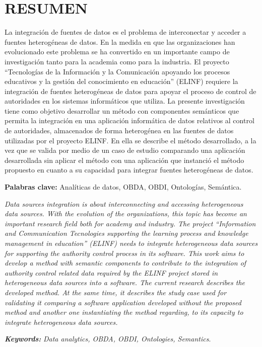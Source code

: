 \chapter*{\large RESUMEN}

La integración de fuentes de datos es el problema de interconectar y acceder a fuentes heterogéneas de datos. En la medida en que las organizaciones han evolucionado este problema se ha convertido en un importante campo de investigación tanto para la academia como para la industria. El proyecto ``Tecnologías de la Información y la Comunicación apoyando los procesos educativos y la gestión del conocimiento en educación'' (ELINF) requiere la integración de fuentes heterogéneas de datos para apoyar el proceso de control de autoridades en los sistemas informáticos que utiliza. La presente investigación tiene como objetivo desarrollar un método con componentes semánticos que permita la integración en una aplicación informática de datos relativos al control de autoridades, almacenados de forma heterogénea en las fuentes de datos utilizadas por el proyecto ELINF. En ella se describe el método desarrollado, a la vez que se valida por medio de un caso de estudio comparando una aplicación desarrollada sin aplicar el método con una aplicación que instanció el método propuesto en cuanto a su capacidad para integrar fuentes heterogéneas de datos.

\textbf{Palabras clave:} Analíticas de datos, OBDA, OBDI, Ontologías, Semántica.

\textit{Data sources integration is about interconnecting and accessing heterogeneous data sources. With the evolution of the organizations, this topic has become an important research field both for academy and industry. The project ``Information and Communication Tecnologies supporting the learning process and knowledge management in education'' (ELINF) needs to integrate heterogeneous data sources for supporting the authority control process in its software. This work aims to develop a method with semantic components to contribute to the integration of authority control related data required by the ELINF project stored in heterogeneous data sources  into a software. The current research describes the developed method. At the same time, it describes the study case used for validating it comparing a software application developed without the proposed method and another one instantiating the method regarding, to its capacity to integrate heterogeneous data sources.}

\textit{\textbf{Keywords: }} \textit{Data analytics, OBDA, OBDI, Ontologies, Semantics}.